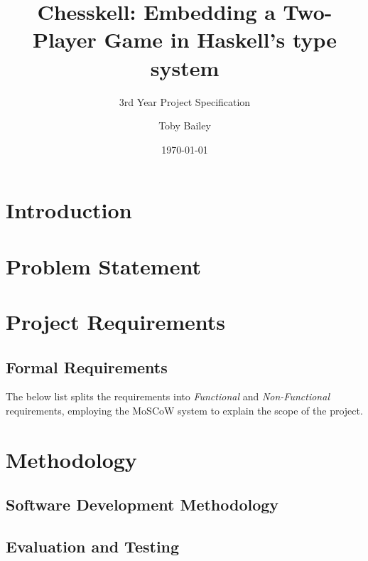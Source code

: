 \documentclass[12pt, a4paper]{scrartcl}
\title{Chesskell: Embedding a Two-Player Game in Haskell's type system}
\subtitle{3rd Year Project Specification}
\author{Toby Bailey}
\date{\today}
\begin{document}
\begin{titlepage}
    \maketitle
    \tableofcontents
\end{titlepage}

\section{Introduction}


\section{Problem Statement}


\section{Project Requirements}


\subsection{Formal Requirements}

The below list splits the requirements into \emph{Functional} and \emph{Non-Functional} requirements, employing the MoSCoW system to explain the scope of the project.


\section{Methodology}


\subsection{Software Development Methodology}

\subsection{Evaluation and Testing}
\end{document}
